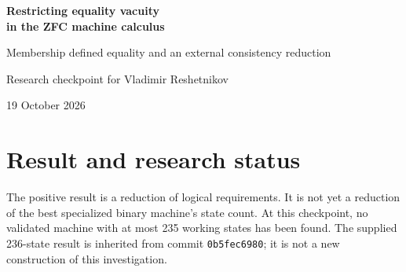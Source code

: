\documentclass[11pt,letterpaper]{article}
\theoremstyle{definition}\newtheorem{definition}[theorem]{Definition}
\theoremstyle{remark}\newtheorem{remark}[theorem]{Remark}
\newcommand{\Eq}{\mathsf{Eq}}
\newcommand{\All}{\mathsf{All}}
\newcommand{\weq}{\operatorname{weq}}
\newcommand{\To}{\rightarrow}
\newcommand{\Hh}{H_{\mathrm{eq}}}
\newcommand{\file}[1]{\begingroup\small\ttfamily\nolinkurl{#1}\endgroup}
\begin{document}
\begin{center}
{\LARGE\bfseries Restricting equality vacuity\\[4pt]in the ZFC machine calculus}\par
\vspace{9pt}
{\large Membership defined equality and an external consistency reduction}\par
\vspace{9pt}
Research checkpoint for Vladimir Reshetnikov\par
19 October 2026
\end{center}
\vspace{5pt}
\begin{abstract}
The full fresh equality-vacuity family in the original substitution-free Tarski frontend can be restricted to one literal native-code binder per equality atom. Keep the original eight logical rows, membership vacuity, CP and native GIC, and replace
\[
 \Eq(a,b)\To\All_c\Eq(a,b)\quad(c\ne a,b)
 \qquad\text{by}\qquad
 \Eq(a,b)\To\All_{\weq(a,b)}\Eq(a,b).
\]
The resulting theory $\Hh$ is equiconsistent with ordinary ZFC, in the external classical metatheory and relative to the existing completeness and model-construction endpoints identified here. The proof interprets comparison equality as two-sided membership indiscernibility. A restricted quantifier-free specialization argument and explicit auxiliary-binder transport avoid circular uses of general substitution or alpha conversion. Equality-free comparison matrices preserve the actual native GIC output codes. Independent finite certificates support the construction, including label zero and binder collisions. This is a mathematical consistency result; the modified native Lean proof relation, proof-assistant verification of selected-source enumeration, and a new binary-machine halting endpoint remain to be supplied. A separate ordinary source/enumerator binding is included in Appendix~\ref{sec:binding}.
\end{abstract}

\section{Result and research status}
The positive result is a reduction of logical requirements. It is not yet a reduction of the best specialized binary machine's state count. At this checkpoint, no validated machine with at most 235 working states has been found. The supplied 236-state result is inherited from commit \file{0b5fec6980}; it is not a new construction of this investigation.
\end{document}
